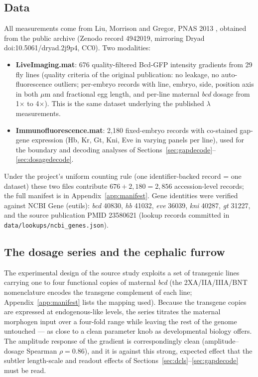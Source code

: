 \label{sec:studyC}

\subsection{Data}

All measurements come from Liu, Morrison and Gregor, PNAS 2013
\cite{liu2013}, obtained from the public archive (Zenodo record 4942019,
mirroring Dryad doi:10.5061/dryad.2j9p4, CC0). Two modalities:

\begin{itemize}
\item \textbf{LiveImaging.mat}: 676 quality-filtered Bcd-GFP intensity
gradients from 29 fly lines (quality criteria of the original publication:
no leakage, no auto-fluorescence outliers; per-embryo records with line,
embryo, side, position axis in both $\mu$m and fractional egg length, and
per-line maternal \emph{bcd} dosage from 1$\times$ to 4$\times$). This is
the same dataset underlying the published $\lambda$ measurements.
\item \textbf{Immunofluorescence.mat}: 2{,}180 fixed-embryo records with
co-stained gap-gene expression (Hb, Kr, Gt, Kni, Eve in varying panels per
line), used for the boundary and decoding analyses of
Sections~\ref{sec:gapdecode}--\ref{sec:dosagedecode}.
\end{itemize}

Under the project's uniform counting rule (one identifier-backed record = one
dataset) these two files contribute $676 + 2{,}180 = 2{,}856$ accession-level
records; the full manifest is in Appendix~\ref{app:manifest}. Gene identities
were verified against NCBI Gene (eutils): \emph{bcd} 40830, \emph{hb} 41032,
\emph{eve} 36039, \emph{kni} 40287, \emph{gt} 31227, and the source
publication PMID 23580621 (lookup records committed in
\texttt{data/lookups/ncbi\_genes.json}).



\subsection{The dosage series and the cephalic furrow}

The experimental design of the source study \cite{liu2013} exploits a set of
transgenic lines carrying one to four functional copies of maternal
\emph{bcd} (the 2XA/IIA/IIIA/BNT nomenclature encodes the transgene
complement of each line; Appendix~\ref{app:manifest} lists the mapping used).
Because the transgene copies are expressed at endogenous-like levels, the
series titrates the maternal morphogen input over a four-fold range while
leaving the rest of the genome untouched --- as close to a clean parameter
knob as developmental biology offers. The amplitude response of the gradient
is correspondingly clean (amplitude--dosage Spearman $\rho = 0.86$), and it
is against this strong, expected effect that the subtler length-scale and
readout effects of Sections~\ref{sec:dcls}--\ref{sec:gapdecode} must be read.

